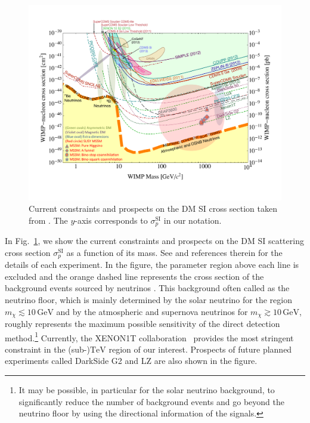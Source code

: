 \documentclass[12pt,twoside,book]{article}
\begin{document}
\begin{figure}[t]
  \centering
  \includegraphics[width=0.8\hsize]{SNOWMASS_LimitPlot_SI_v3.pdf}
  \caption{
    Current constraints and prospects on the DM SI cross section taken from \cite{Cushman:2013zza}.
    The $y$-axis corresponds to $\sigma_p^{\mathrm{SI}}$ in our notation.
  }
  \label{fig:XENON1T}
\end{figure}

In Fig.~\ref{fig:XENON1T}, we show the current constraints and prospects on the DM SI scattering cross section $\sigma_p^{\mathrm{SI}}$ as a function of its mass.
See \cite{Cushman:2013zza} and references therein for the details of each experiment.
In the figure, the parameter region above each line is excluded and the orange dashed line represents the cross section of the background events sourced by neutrinos \cite{Billard:2013qya}.
This background often called as the neutrino floor, which is mainly determined by the solar neutrino for the region $m_\chi \lesssim 10\,\mathrm{GeV}$ and by the atmospheric and supernova neutrinos for $m_\chi \gtrsim 10\,\mathrm{GeV}$, roughly represents the maximum possible sensitivity of the direct detection method.\footnote{
  It may be possible, in particular for the solar neutrino background, to significantly reduce the number of background events and go beyond the neutrino floor by using the directional information of the signals.
}
Currently, the XENON1T collaboration~\cite{Aprile:2018dbl} provides the most stringent constraint in the (sub-)$\text{TeV}$ region of our interest.
Prospects of future planned experiments called DarkSide G2 \cite{Aalseth:2015mba} and LZ \cite{Mount:2017qzi} are also shown in the figure.
\end{document}
